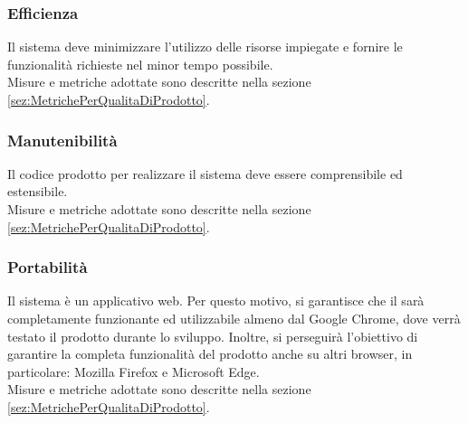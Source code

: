 \documentclass[../PianoDiQualifica.tex]{subfiles}
\begin{document}
			\subsubsection{Efficienza}
				Il sistema deve minimizzare l'utilizzo delle risorse impiegate e
				fornire le funzionalità richieste nel minor tempo possibile.\\
				Misure e metriche adottate sono descritte nella sezione \ref{sez:MetrichePerQualitaDiProdotto}.
			\subsubsection{Manutenibilità}
				Il codice prodotto per realizzare il sistema deve essere comprensibile
				ed estensibile.\\
				Misure e metriche adottate sono descritte nella sezione \ref{sez:MetrichePerQualitaDiProdotto}.
			\subsubsection{Portabilità}
				Il sistema è un applicativo web. Per questo motivo, si garantisce che
				il  sarà completamente funzionante ed utilizzabile
				almeno dal 	Google Chrome, dove verrà testato il prodotto
				durante lo sviluppo. Inoltre, si perseguirà l'obiettivo di garantire la
				completa funzionalità del prodotto anche su altri browser, in particolare:
				Mozilla Firefox e Microsoft Edge.\\
				Misure e metriche adottate sono descritte nella sezione \ref{sez:MetrichePerQualitaDiProdotto}.
\end{document}
